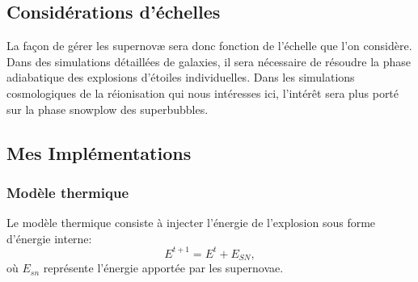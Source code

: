 \subsection{Considérations d'échelles}
La façon de gérer les supernovæ sera donc fonction de l'échelle que l'on considère.
Dans des simulations détaillées de galaxies, il sera nécessaire de résoudre la phase adiabatique des explosions d'étoiles individuelles. %
Dans les simulations cosmologiques de la réionisation qui nous intéresses ici, l’intérêt sera plus porté sur la phase snowplow des superbubbles.

%

\subsection{Mes Implémentations}
\label{sec:SNmodel}

\subsubsection{Modèle thermique}
Le modèle thermique consiste à injecter l’énergie de l'explosion sous forme d’énergie interne:
\begin{equation}
E^{t+1} = E^t + E_{SN},
\end{equation}
où $E_{sn}$ représente l'énergie apportée par les supernovae.

